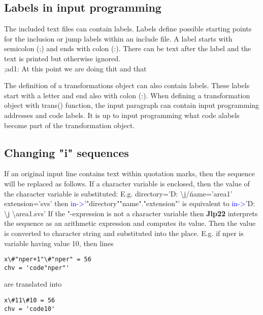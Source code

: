 \subsection{ Labels in input programming}
\label{inpuad}

The included text files can contain labels. Labels define possible starting points for the
inclusion or jump labels within an include file. A label starts with semicolon (;) and
ends with colon (:). There can be text after the label and the text is printed but
otherwise ignored.\\


;ad1:  At this point we are doing thit and that


\begin{note}
The definition of a transformations object can also contain labels. These labels start
with a letter and end also with colon (:). When defining a transformation object with \textcolor{VioletRed}{trans}() function,
the input paragraph can contain input programming addresses and code labels. It is up to
input programming what code alabels become part of the transformation object.
\end{note}


\subsection{Changing "i" sequences}
\label{inpureplace}
If an original input line contains text within quotation marks, then the sequence will be replaced
as follows. If a character variable is enclosed, then the value of the character variable is
substituted: E.g.
directory='D: \textbackslash j/\'
name='area1'
extension='svs'
then
\textcolor{blue}{in->}'"directory""name"."extension"'
is equivalent to
\textcolor{blue}{in->}'D: \textbackslash j \textbackslash area1.svs'
If the "-expression is not a character variable then \textbf{Jlp22} interprets the sequence as an arithmetic
expression and computes its value. Then the value is converted to character string and
substituted into the place. E.g. if nper is variable having value 10, then lines
\color{Green}
\begin{verbatim}
x\#"nper+1"\#"nper" = 56
chv = 'code"nper"'
\end{verbatim}
\color{Black}
are translated into
\color{Green}
\begin{verbatim}
x\#11\#10 = 56
chv = 'code10'
\end{verbatim}
\color{Black}

